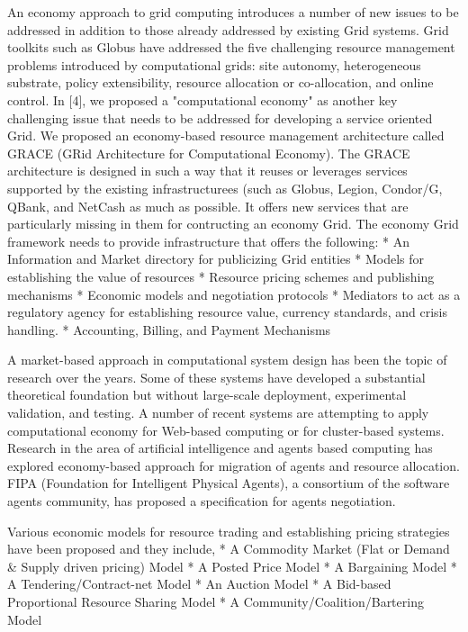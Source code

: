 \documentclass{article}
\begin{document}
An economy approach to grid computing introduces a number of new issues to be addressed in addition to those already addressed by existing Grid systems. Grid toolkits such as Globus have addressed the five challenging resource management problems introduced by computational grids: site autonomy, heterogeneous substrate, policy extensibility, resource allocation or co-allocation, and online control. In [4], we proposed a "computational economy" as another key challenging issue that needs to be addressed for developing a service oriented Grid. We proposed an economy-based resource management architecture called GRACE (GRid Architecture for Computational Economy). The GRACE architecture is designed in such a way that it reuses or leverages services supported by the existing infrastructurees (such as Globus, Legion, Condor/G, QBank, and NetCash as much as possible. It offers new services that are particularly missing in them for contructing an economy Grid. The economy Grid framework needs to provide infrastructure that offers the following:
* An Information and Market directory for publicizing Grid entities
* Models for establishing the value of resources
* Resource pricing schemes and publishing mechanisms
* Economic models and negotiation protocols
* Mediators to act as a regulatory agency for establishing resource value, currency standards, and crisis handling. 
* Accounting, Billing, and Payment Mechanisms

A market-based approach in computational system design has been the topic of research over the years. Some of these systems have developed a substantial theoretical foundation but without large-scale deployment, experimental validation, and testing. A number of recent systems are attempting to apply computational economy for Web-based computing or for cluster-based systems. Research in the area of artificial intelligence and agents based computing has explored economy-based approach for migration of agents and resource allocation. FIPA (Foundation for Intelligent Physical Agents), a consortium of the software agents community, has proposed a specification for agents negotiation.

Various economic models for resource trading and establishing pricing strategies have been proposed and they include,
* A Commodity Market (Flat or Demand & Supply driven pricing) Model
* A Posted Price Model
* A Bargaining Model
* A Tendering/Contract-net Model
* An Auction Model
* A Bid-based Proportional Resource Sharing Model
* A Community/Coalition/Bartering Model
\end{document}
